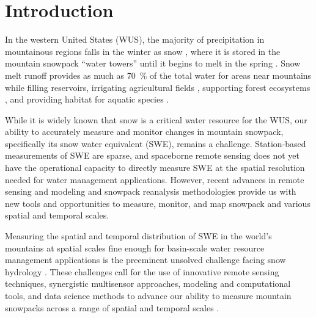 
\hypertarget{ch1}{%
\chapter{Introduction}\label{ch1}}


In the western United States (WUS), the majority of precipitation in mountainous regions falls in the winter as snow \citep{serrezeCharacteristicsWesternUnited1999}, where it is stored in the mountain snowpack ``water towers” until it begins to melt in the spring \citep{immerzeelImportanceVulnerabilityWorld2020,viviroliIncreasingDependenceLowland2020}. Snow melt runoff provides as much as 70~\% of the total water for areas near mountains \citep{liHowMuchRunoff2017} while filling reservoirs, irrigating agricultural fields \citep{qinSnowmeltRiskTelecouplings2022}, supporting forest ecosystems \citep{varholaForestCanopyEffects2010}, and providing habitat for aquatic species \citep{yarnellEcologyManagementSpring2010}. 

While it is widely known that snow is a critical water resource for the WUS, our ability to accurately measure and monitor changes in mountain snowpack, specifically its snow water equivalent (SWE), remains a challenge. Station-based measurements of SWE are sparse, and spaceborne remote sensing does not yet have the operational capacity to directly measure SWE at the spatial resolution needed for water management applications. However, recent advances in remote sensing and modeling \citep{lievensSnowDepthVariability2019,tarriconeEstimatingSnowAccumulation2023a,tsangReviewArticleGlobal2022,hedrickDirectInsertionNASA2018} and snowpack reanalysis methodologies \citep{margulisLandsatEraSierraNevada2016} provide us with new tools and opportunities to measure, monitor, and map snowpack and various spatial and temporal scales.

Measuring the spatial and temporal distribution of SWE in the world’s mountains at spatial scales fine enough for basin-scale water resource management applications is the preeminent unsolved challenge facing snow hydrology \citep{lettenmaierInroadsRemoteSensing2015, dozierEstimatingSpatialDistribution2016}. These challenges call for the use of innovative remote sensing techniques, synergistic multisensor approaches, modeling and computational tools, and data science methods to advance our ability to measure mountain snowpacks across a range of spatial and temporal scales \citep{dozierMountainHydrologySnow2011}. 

